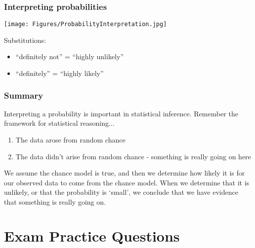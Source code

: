 \begin{frame}
\frametitle{Interpreting probabilities}
\begin{center}
\texttt{[image: Figures/ProbabilityInterpretation.jpg]}
\end{center}
Substitutions:
\begin{itemize}
\item ``definitely not'' =  ``highly unlikely''
\item  ``definitely'' = ``highly likely''
\end{itemize}
\end{frame}


\begin{frame}
\frametitle{Summary}
Interpreting a probability is important in statistical inference.  Remember the framework for statistical reasoning...
\begin{enumerate}
    \item
    The data arose from random chance
    \item
    The data didn't arise from random chance - something is really going on here
\end{enumerate}
We assume the chance model is true, and then we determine how likely it is for our observed data to come from the chance model.  When we determine that it is unlikely, or that the probability is `small', we conclude that we have evidence that something is really going on.
\end{frame}




\section[Practice]{Exam Practice Questions}
\begin{frame}
\end{frame}

